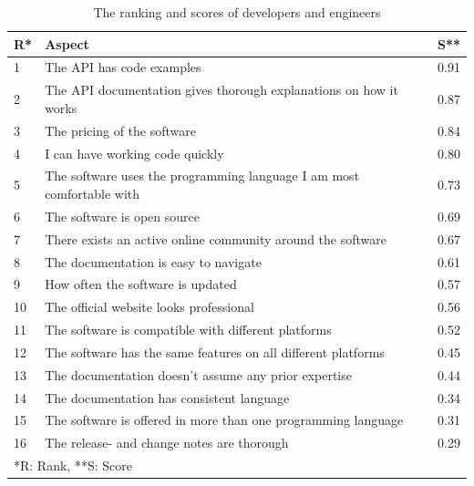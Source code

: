 \documentclass{cslthse-msc}
\begin{document}
    \begin{table}[H]
        \centering
        \caption{The ranking and scores of developers and engineers}
        \label{tab:devs}
        \begin{tabularx}{\columnwidth}{ l X r}

        {\textbf{R}*} &   \textbf{Aspect}   & {\textbf{S}**} \\ \hline
        1 &      The API has code examples                                             &  0.91             \\ \hline
        2 &      The API documentation gives thorough explanations on how it works     &  0.87             \\ \hline
        3 &      The pricing of the software                                           &  0.84             \\ \hline
        4 &      I can have working code quickly                                       &  0.80             \\ \hline
        5 &      The software uses the programming language I am most comfortable with &  0.73             \\ \hline
        6 &      The software is open source                                           &  0.69             \\ \hline
        7 &      There exists an active online community around the software           &  0.67             \\ \hline
        8 &      The documentation is easy to navigate                                 &  0.61             \\ \hline
        9 &      How often the software is updated                                     &  0.57             \\ \hline
        10 &      The official website looks professional                               &  0.56             \\ \hline
        11 &      The software is compatible with different platforms                   &  0.52             \\ \hline
        12 &      The software has the same features on all different platforms         &  0.45             \\ \hline
        13 &      The documentation doesn't assume any prior expertise                  &  0.44             \\ \hline
        14 &      The documentation has consistent language                             &  0.34             \\ \hline
        15 &      The software is offered in more than one programming language         &  0.31             \\ \hline
        16 &      The release- and change notes are thorough                            &  0.29             \\ \hline \hline
        \multicolumn{3}{l}{*R: Rank, **S: Score}
        \end{tabularx}
    \end{table}
\end{document}
